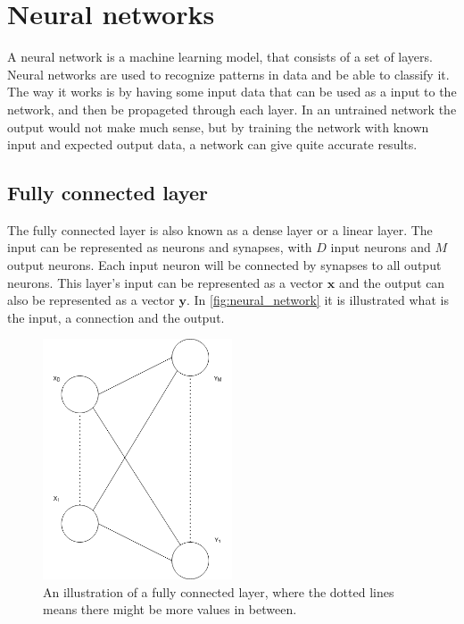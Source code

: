 \section{Neural networks}%
\label{sec:Neural networks}

A neural network is a machine learning model, that consists of a set of layers. Neural networks are used to recognize patterns in data and be able to classify it. The way it works is by having some input data that can be used as a input to the network, and then be propageted through each layer. In an untrained network the output would not make much sense, but by training the network with known input and expected output data, a network can give quite accurate results.

\subsection{Fully connected layer}%
\label{sub:Fully connected layer}

The fully connected layer is also known as a dense layer or a linear layer.
The input can be represented as neurons and synapses, with $D$ input neurons and $M$ output neurons. Each input neuron will be connected by synapses to all output neurons.
This layer's input can be represented as a vector $\bm{x}$ and the output can also be represented as a vector $\bm{y}$.
In \autoref{fig:neural_network} it is illustrated what is the input, a connection and the output.

\begin{figure}
    \centering
    \includegraphics[width=0.5\textwidth]{assets/linear-layer.png}
    \caption{An illustration of a fully connected layer, where the dotted lines means there might be more values in between.}
    \label{fig:neural_network}
\end{figure}


